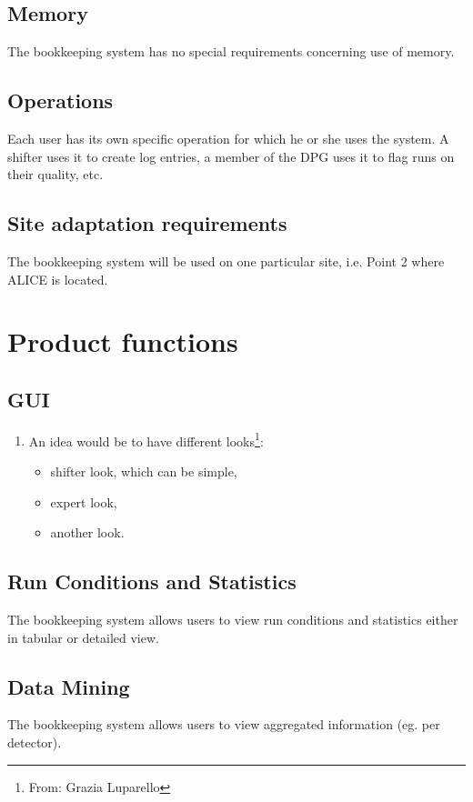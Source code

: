 \subsection{Memory}
The bookkeeping system has no special requirements concerning use of memory.

\subsection{Operations}
Each user has its own specific operation for which he or she uses the system. A shifter uses it to create log entries, a member of the DPG uses it to flag runs on their quality, etc.

\subsection{Site adaptation requirements}
The bookkeeping system will be used on one particular site, i.e. Point 2 where ALICE is located.

\section{Product functions}
\subsection{GUI}
\begin{enumerate}
  \item An idea would be to have different looks\footnote{From: Grazia Luparello}:
  \begin{itemize}
    \item shifter look, which can be simple,
    \item expert look,
    \item another look.
  \end{itemize}
\end{enumerate}
\subsection{Run Conditions and Statistics}
The bookkeeping system allows users to view run conditions and statistics either in tabular or detailed view.

\subsection{Data Mining}
The bookkeeping system allows users to view aggregated information (eg. per detector).
